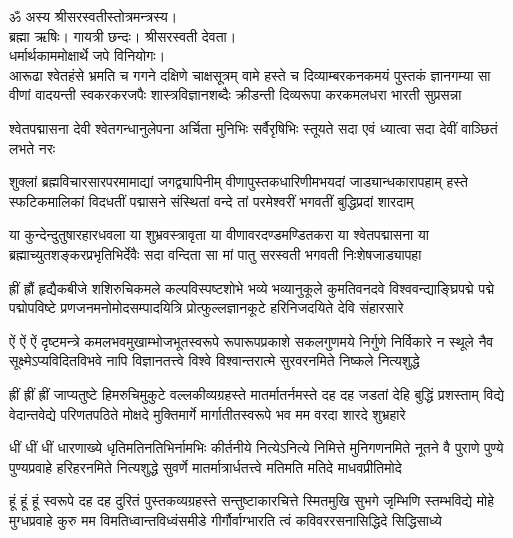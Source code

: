 
\setlength{\shlokaspaceskip}{12pt}
ॐ अस्य श्रीसरस्वतीस्तोत्रमन्त्रस्य।\\
ब्रह्मा ऋषिः। गायत्री छन्दः। श्रीसरस्वती देवता।\\
धर्मार्थकाममोक्षार्थे जपे विनियोगः।\\

\nopagebreak[4]
\fourlineindentedshloka
{आरूढा श्वेतहंसे भ्रमति च गगने दक्षिणे चाक्षसूत्रम्}
{वामे हस्ते च दिव्याम्बरकनकमयं पुस्तकं ज्ञानगम्या}
{सा वीणां वादयन्ती स्वकरकरजपैः शास्त्रविज्ञानशब्दैः}
{क्रीडन्ती दिव्यरूपा करकमलधरा भारती सुप्रसन्ना}

\threelineshloka
{श्वेतपद्मासना देवी श्वेतगन्धानुलेपना}
{अर्चिता मुनिभिः सर्वैरृषिभिः स्तूयते सदा}
{एवं ध्यात्वा सदा देवीं वाञ्छितं लभते नरः}

\fourlineindentedshloka
{शुक्लां ब्रह्मविचारसारपरमामाद्यां जगद्व्यापिनीम्}
{वीणापुस्तकधारिणीमभयदां जाड्यान्धकारापहाम्}
{हस्ते स्फटिकमालिकां विदधतीं पद्मासने संस्थितां}
{वन्दे तां परमेश्वरीं भगवतीं बुद्धिप्रदां शारदाम्}

\fourlineindentedshloka
{या कुन्देन्दुतुषारहारधवला या शुभ्रवस्त्रावृता}
{या वीणावरदण्डमण्डितकरा या श्वेतपद्मासना}
{या ब्रह्माच्युतशङ्करप्रभृतिभिर्देवैः सदा वन्दिता}
{सा मां पातु सरस्वती भगवती निःशेषजाड्यापहा}

\fourlineindentedshloka
{ह्रीं ह्रौं हृद्यैकबीजे शशिरुचिकमले कल्पविस्पष्टशोभे}
{भव्ये भव्यानुकूले कुमतिवनदवे विश्ववन्द्याङ्घ्रिपद्मे}
{पद्मे पद्मोपविष्टे प्रणजनमनोमोदसम्पादयित्रि}
{प्रोत्फुल्लज्ञानकूटे हरिनिजदयिते देवि संहारसारे}

\fourlineindentedshloka
{ऐं ऐं ऐं दृष्टमन्त्रे कमलभवमुखाम्भोजभूतस्वरूपे}
{रूपारूपप्रकाशे सकलगुणमये निर्गुणे निर्विकारे}
{न स्थूले नैव सूक्ष्मेऽप्यविदितविभवे नापि विज्ञानतत्त्वे}
{विश्वे विश्वान्तरात्मे सुरवरनमिते निष्कले नित्यशुद्धे}

\fourlineindentedshloka
{ह्रीं ह्रीं ह्रीं जाप्यतुष्टे हिमरुचिमुकुटे वल्लकीव्यग्रहस्ते}
{मातर्मातर्नमस्ते दह दह जडतां देहि बुद्धिं प्रशस्ताम्}
{विद्ये वेदान्तवेद्ये परिणतपठिते मोक्षदे मुक्तिमार्गे}
{मार्गातीतस्वरूपे भव मम वरदा शारदे शुभ्रहारे}

\fourlineindentedshloka
{धीं धीं धीं धारणाख्ये धृतिमतिनतिभिर्नामभिः कीर्तनीये}
{नित्येऽनित्ये निमित्ते मुनिगणनमिते नूतने वै पुराणे}
{पुण्ये पुण्यप्रवाहे हरिहरनमिते नित्यशुद्धे सुवर्णे}
{मातर्मात्रार्धतत्त्वे मतिमति मतिदे माधवप्रीतिमोदे}

\fourlineindentedshloka
{हूं हूं हूं स्वरूपे दह दह दुरितं पुस्तकव्यग्रहस्ते}
{सन्तुष्टाकारचित्ते स्मितमुखि सुभगे जृम्भिणि स्तम्भविद्ये}
{मोहे मुग्धप्रवाहे कुरु मम विमतिध्वान्तविध्वंसमीडे}
{गीर्गौर्वाग्भारति त्वं कविवररसनासिद्धिदे सिद्धिसाध्ये}

